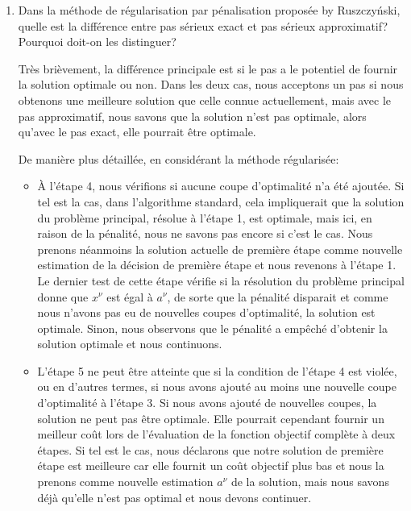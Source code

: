\documentclass[12pt]{book}
\begin{document}
\begin{enumerate}
\item

Dans la méthode de régularisation par pénalisation proposée by Ruszczy\'nski, quelle est la différence entre pas sérieux exact et pas sérieux approximatif? Pourquoi doit-on les distinguer?

Très brièvement, la différence principale est si le pas a le potentiel de fournir la solution optimale ou non. Dans les deux cas, nous acceptons un pas si nous obtenons une meilleure solution que celle connue actuellement, mais avec le pas approximatif, nous savons que la solution n'est pas optimale, alors qu'avec le pas exact, elle pourrait être optimale.

De manière plus détaillée, en considérant la méthode régularisée:
\begin{itemize}
\item 
À l'étape 4, nous vérifions si aucune coupe d'optimalité n'a été ajoutée. Si tel est la cas, dans l'algorithme standard, cela impliquerait que la solution du problème principal, résolue à l'étape 1, est optimale, mais ici, en raison de la pénalité, nous ne savons pas encore si c'est le cas.
Nous prenons néanmoins la solution actuelle de première étape comme nouvelle estimation de la décision de première étape et nous revenons à l’étape 1. Le dernier test de cette étape vérifie si la résolution du problème principal donne que $x^\nu$ est égal à $a^{\nu}$, de sorte que la pénalité disparait et comme nous n’avons pas eu de nouvelles coupes d’optimalité, la solution est optimale. Sinon, nous observons que le pénalité a empêché d’obtenir la solution optimale et nous continuons.
\item
L’étape 5 ne peut être atteinte que si la condition de l’étape 4 est violée, ou en d’autres termes, si nous avons ajouté au moins une nouvelle coupe d'optimalité à l’étape 3. Si nous avons ajouté de nouvelles coupes, la solution ne peut pas être optimale.
Elle pourrait cependant fournir un meilleur coût lors de l’évaluation de la fonction objectif complète à deux étapes. Si tel est le cas, nous déclarons que notre solution de première étape est meilleure car elle fournit un coût objectif plus bas et nous la prenons comme nouvelle estimation $a^{\nu}$ de la solution, mais nous savons déjà qu'elle n’est pas optimal et nous devons continuer.
\end{itemize}


\end{enumerate}
\end{document}
